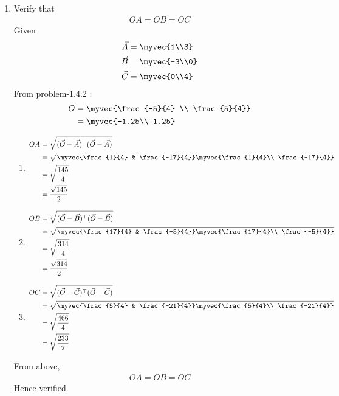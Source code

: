 \documentclass[11pt]{book}
\begin{document}
\begin{enumerate}[label=\thesection.\arabic*.,ref=\thesection.\theenumi]
\item Verify that 
\begin{align}
OA = OB = OC 
\end{align} 
\solution
Given \begin{align}
\vec{A} &= \myvec{1\\3}\\
\vec{B} &= \myvec{-3\\0}\\
\vec{C} &= \myvec{0\\4}
\end{align}
From problem-1.4.2 :
\begin{align}
O &= \myvec{\frac{-5}{4} \\ \frac{5}{4}}\\
 &= \myvec{-1.25\\ 1.25}
\end{align}
\begin{enumerate}
\item 
\begin{align}
OA &= \sqrt{(\vec{O}-\vec{A})^{\top}(\vec{O}-\vec{A})}\\
&= \sqrt{\myvec{\frac{1}{4} & \frac{-17}{4}} \myvec{\frac{1}{4}\\ \frac{-17}{4}}}\\
 &= \sqrt{\frac{145}{4}}\\
 &= \frac{\sqrt{145}}{2}
\end{align}
\item 
\begin{align}
OB &= \sqrt{(\vec{O}-\vec{B})^{\top}(\vec{O}-\vec{B})}\\
 &= \sqrt{\myvec{\frac{17}{4} & \frac{-5}{4}} \myvec{\frac{17}{4}\\ \frac{-5}{4}}}\\
 &= \sqrt{\frac{314}{4}}\\
 &= \frac{\sqrt{314}}{2}
\end{align}
\item 
\begin{align}
OC &= \sqrt{(\vec{O}-\vec{C})^{\top}(\vec{O}-\vec{C})}\\
 &= \sqrt{\myvec{\frac{5}{4} & \frac{-21}{4}}  \myvec{\frac{5}{4}\\ \frac{-21}{4}}}\\
 &= \sqrt{\frac{466}{4}}\\
 &= \sqrt{\frac{233}{2}}\\
\end{align}
\end{enumerate}
From above, 
\begin{align}
OA = OB = OC
\end{align}
Hence verified.


\end{enumerate}
\end{document}
